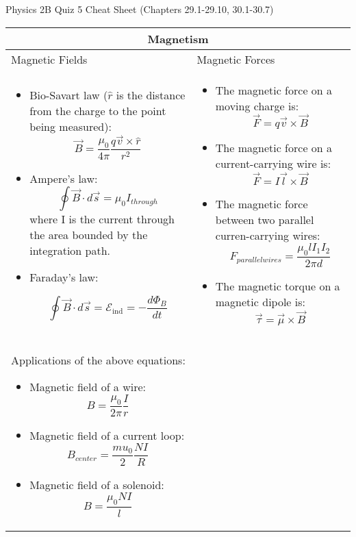 \documentclass{article}
\begin{document}
\LARGE Physics 2B Quiz 5 Cheat Sheet (Chapters 29.1-29.10, 30.1-30.7)

\hrulefill
\normalsize

\begin{center}
	\begin{tabular}{|p{8cm}|p{8cm}|}
		\hline
		\multicolumn{2}{|c|}{Magnetism}                                                     \\
		\hline

		Magnetic Fields & Magnetic Forces                                                   \\

		\begin{itemize}
			\item Bio-Savart law ($ \hat{r}$ is the distance from the charge to the point being measured):
			      \[ \vec{B} = \frac{\mu_0}{4\pi} \frac{q\vec{v} \times \hat{r}}{r^2} \]
			\item Ampere's law:
			      \[ \oint \vec{B} \cdot d \vec{s} = \mu_0 I_{through} \]
			      where I is the current through the area bounded by the integration path.

			\item Faraday's law:

			      \[ \oint \vec B \cdot d \vec s = \mathcal{E}_\text{ind} = - \frac{d \Phi_B}{dt} \]
		\end{itemize}

		                &

		\begin{itemize}
			\item The magnetic force on a moving charge is:
			      \[ \vec{F} = q\vec{v} \times \vec{B} \]
			\item The magnetic force on a current-carrying wire is:
			      \[ \vec{F} = I\vec{l} \times \vec{B} \]
			\item The magnetic force between two parallel curren-carrying wires:
			      \[ F_{parallel wires} = \frac{\mu_0 l I_1 I_2}{2 \pi d}\]
			\item The magnetic torque on a magnetic dipole is:
			      \[ \vec{\tau} = \vec{\mu} \times \vec{B}\]
		\end{itemize} \\
		\hline

		Applications of the above equations:
		\begin{itemize}
			\item Magnetic field of a wire:
			      \[B = \frac{\mu_0}{2\pi} \frac{I}{r}\]
			\item Magnetic field of a current loop:
			      \[B_{center} = \frac{mu_0}{2}\frac{NI}{R}\]
			\item Magnetic field of a solenoid:
			      \[B = \frac{\mu_0NI}{l}\]
		\end{itemize}


\end{tabular}
\end{center}
\end{document}
